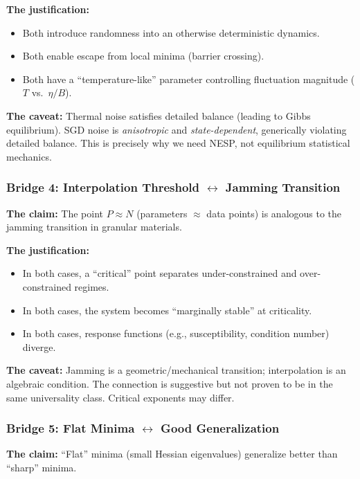 \documentclass[
  journal=largetwo,
  simfonts=false,
  year=2025,
  volume=37,
]{cup-journal}
\begin{document}
\textbf{The justification:}
\begin{itemize}
    \item Both introduce randomness into an otherwise deterministic dynamics.
    \item Both enable escape from local minima (barrier crossing).
    \item Both have a ``temperature-like'' parameter controlling fluctuation magnitude ($T$ vs.\ $\eta/B$).
\end{itemize}

\textbf{The caveat:} Thermal noise satisfies detailed balance (leading to Gibbs equilibrium). SGD noise is \textit{anisotropic} and \textit{state-dependent}, generically violating detailed balance. This is precisely why we need NESP, not equilibrium statistical mechanics.

\subsubsection{Bridge 4: Interpolation Threshold \texorpdfstring{$\leftrightarrow$}{<->} Jamming Transition}

\textbf{The claim:} The point $P \approx N$ (parameters $\approx$ data points) is analogous to the jamming transition in granular materials.

\textbf{The justification:}
\begin{itemize}
    \item In both cases, a ``critical'' point separates under-constrained and over-constrained regimes.
    \item In both cases, the system becomes ``marginally stable'' at criticality.
    \item In both cases, response functions (e.g., susceptibility, condition number) diverge.
\end{itemize}

\textbf{The caveat:} Jamming is a geometric/mechanical transition; interpolation is an algebraic condition. The connection is suggestive but not proven to be in the same universality class. Critical exponents may differ.

\subsubsection{Bridge 5: Flat Minima \texorpdfstring{$\leftrightarrow$}{<->} Good Generalization}

\textbf{The claim:} ``Flat'' minima (small Hessian eigenvalues) generalize better than ``sharp'' minima.
\end{document}
